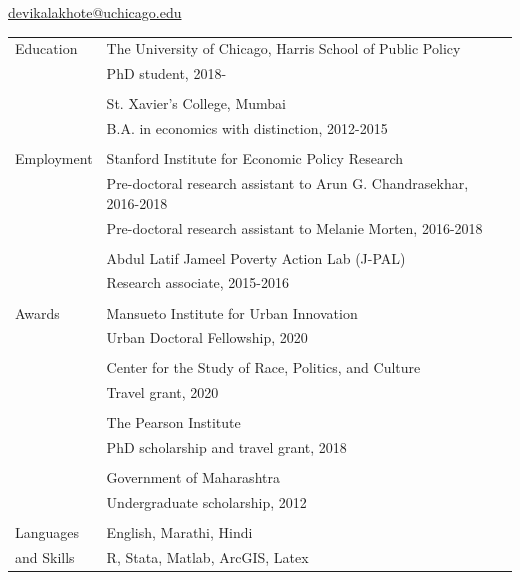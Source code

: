 \documentclass[letterpaper,12pt,oneside]{article}
\begin{document}
 \hfill \href{mailto:devikalakhote@uchicago.edu}{devikalakhote@uchicago.edu}

\vspace{3em}


\noindent \begin{tabular}{@{} l l}

\large{Education} & The University of Chicago, Harris School of Public Policy \\
    & PhD student, 2018- \\
    & \\
    & St. Xavier's College, Mumbai \\
    & B.A. in economics with distinction, 2012-2015 \\
    & \\

\large{Employment} & Stanford Institute for Economic Policy Research \\
    & Pre-doctoral research assistant to Arun G. Chandrasekhar, 2016-2018 \\
    & Pre-doctoral research assistant to Melanie Morten, 2016-2018 \\
    & \\

    &Abdul Latif Jameel Poverty Action Lab (J-PAL) \\
    & Research associate, 2015-2016 \\
    & \\

\large{Awards}& Mansueto Institute for Urban Innovation \\
    & Urban Doctoral Fellowship, 2020 \\
    & \\

    & Center for the Study of Race, Politics, and Culture \\
    & Travel grant, 2020 \\
    & \\

    & The Pearson Institute \\
    & PhD scholarship and travel grant, 2018 \\
    & \\

    & Government of Maharashtra \\
    & Undergraduate scholarship, 2012  \\
    & \\

\large{Languages}   & English, Marathi, Hindi \\
\large{and Skills}  & R, Stata, Matlab, ArcGIS, Latex   \\

\end{tabular}
\end{document}
